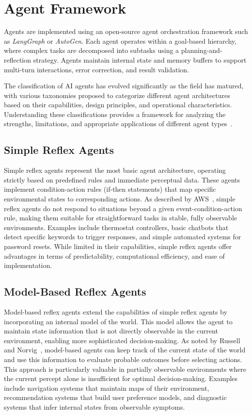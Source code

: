 \section{Agent Framework}

Agents are implemented using an open-source agent orchestration framework such as \textit{LangGraph} or \textit{AutoGen}. Each agent operates within a goal-based hierarchy, where complex tasks are decomposed into subtasks using a planning-and-reflection strategy. Agents maintain internal state and memory buffers to support multi-turn interactions, error correction, and result validation.

The classification of AI agents has evolved significantly as the field has matured, with various taxonomies proposed to categorize different agent architectures based on their capabilities, design principles, and operational characteristics. Understanding these classifications provides a framework for analyzing the strengths, limitations, and appropriate applications of different agent types~\cite{ferrag2025can}.

\subsection{Simple Reflex Agents}

Simple reflex agents represent the most basic agent architecture, operating strictly based on predefined rules and immediate perceptual data. These agents implement condition-action rules (if-then statements) that map specific environmental states to corresponding actions. As described by AWS~\cite{aws2024reflex}, simple reflex agents do not respond to situations beyond a given event-condition-action rule, making them suitable for straightforward tasks in stable, fully observable environments. Examples include thermostat controllers, basic chatbots that detect specific keywords to trigger responses, and simple automated systems for password resets. While limited in their capabilities, simple reflex agents offer advantages in terms of predictability, computational efficiency, and ease of implementation.


\subsection{Model-Based Reflex Agents}

Model-based reflex agents extend the capabilities of simple reflex agents by incorporating an internal model of the world. This model allows the agent to maintain state information that is not directly observable in the current environment, enabling more sophisticated decision-making. As noted by Russell and Norvig~\cite{russell2010aima}, model-based agents can keep track of the current state of the world and use this information to evaluate probable outcomes before selecting actions. This approach is particularly valuable in partially observable environments where the current percept alone is insufficient for optimal decision-making. Examples include navigation systems that maintain maps of their environment, recommendation systems that build user preference models, and diagnostic systems that infer internal states from observable symptoms.


